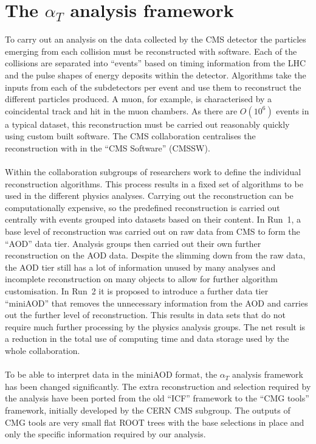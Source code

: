 
\section{The $\alpha_T$ analysis framework}
\label{sec:analysisFw}

To carry out an analysis on the data collected by the CMS detector the particles emerging from each collision must be reconstructed with software. Each of the collisions are separated into ``events'' based on timing information from the LHC and the pulse shapes of energy deposits within the detector. Algorithms take the inputs from each of the subdetectors per event and use them to reconstruct the different particles produced. A muon, for example, is characterised by a coincidental track and hit in the muon chambers. As there are $O(10^6)$ events in a typical dataset, this reconstruction must be carried out reasonably quickly using custom built software. The CMS collaboration centralises the reconstruction with in the ``CMS Software'' (CMSSW). 
\\\\
Within the collaboration subgroups of researchers work to define the individual reconstruction algorithms. This process results in a fixed set of algorithms to be used in the different physics analyses. Carrying out the reconstruction can be computationally expensive, so the predefined reconstruction is carried out centrally with events grouped into datasets based on their content. In Run~1, a base level of reconstruction was carried out on raw data from CMS to form the ``AOD'' data tier. Analysis groups then carried out their own further reconstruction on the AOD data. Despite the slimming down from the raw data, the AOD tier still has a lot of information unused by many analyses and incomplete reconstruction on many objects to allow for further algorithm customisation. In Run~2 it is proposed to introduce a further data tier ``miniAOD'' that removes the unnecessary information from the AOD and carries out the further level of reconstruction. This results in data sets that do not require much further processing by the physics analysis groups. The net result is a reduction in the total use of computing time and data storage used by the whole collaboration.
\\\\
To be able to interpret data in the miniAOD format, the $\alpha_T$ analysis framework has been changed significantly. The extra reconstruction and selection required by the analysis have been ported from the old ``ICF'' framework to the ``CMG tools'' framework, initially developed by the CERN CMS subgroup. The outputs of CMG tools are very small flat ROOT trees with the base selections in place and only the specific information required by our analysis.
